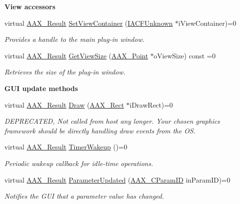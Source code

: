 \begin{Indent}\textbf{ View accessors}\par
\begin{DoxyCompactItemize}
\item 
virtual \mbox{\hyperlink{a00392_a4d8f69a697df7f70c3a8e9b8ee130d2f}{A\+A\+X\+\_\+\+Result}} \mbox{\hyperlink{a01665_a50830385c58f104c87b6ef25144b30dd}{Set\+View\+Container}} (\mbox{\hyperlink{a01409}{I\+A\+C\+F\+Unknown}} $\ast$i\+View\+Container)=0
\begin{DoxyCompactList}\small\item\em Provides a handle to the main plug-\/in window. \end{DoxyCompactList}\item 
virtual \mbox{\hyperlink{a00392_a4d8f69a697df7f70c3a8e9b8ee130d2f}{A\+A\+X\+\_\+\+Result}} \mbox{\hyperlink{a01665_ae67c876225e9b5c538560d19a842a34c}{Get\+View\+Size}} (\mbox{\hyperlink{a01609}{A\+A\+X\+\_\+\+Point}} $\ast$o\+View\+Size) const =0
\begin{DoxyCompactList}\small\item\em Retrieves the size of the plug-\/in window. \end{DoxyCompactList}\end{DoxyCompactItemize}
\end{Indent}
\begin{Indent}\textbf{ G\+UI update methods}\par
\begin{DoxyCompactItemize}
\item 
virtual \mbox{\hyperlink{a00392_a4d8f69a697df7f70c3a8e9b8ee130d2f}{A\+A\+X\+\_\+\+Result}} \mbox{\hyperlink{a01665_a4b132a0bc22ba443027998a56e4eadfb}{Draw}} (\mbox{\hyperlink{a01613}{A\+A\+X\+\_\+\+Rect}} $\ast$i\+Draw\+Rect)=0
\begin{DoxyCompactList}\small\item\em D\+E\+P\+R\+E\+C\+A\+T\+ED, Not called from host any longer. Your chosen graphics framework should be directly handling draw events from the OS. \end{DoxyCompactList}\item 
virtual \mbox{\hyperlink{a00392_a4d8f69a697df7f70c3a8e9b8ee130d2f}{A\+A\+X\+\_\+\+Result}} \mbox{\hyperlink{a01665_aafa484110d39046de1f927f30c9da387}{Timer\+Wakeup}} ()=0
\begin{DoxyCompactList}\small\item\em Periodic wakeup callback for idle-\/time operations. \end{DoxyCompactList}\item 
virtual \mbox{\hyperlink{a00392_a4d8f69a697df7f70c3a8e9b8ee130d2f}{A\+A\+X\+\_\+\+Result}} \mbox{\hyperlink{a01665_a45b468fef806611581f748af9301ab4d}{Parameter\+Updated}} (\mbox{\hyperlink{a00392_a1440c756fe5cb158b78193b2fc1780d1}{A\+A\+X\+\_\+\+C\+Param\+ID}} in\+Param\+ID)=0
\begin{DoxyCompactList}\small\item\em Notifies the G\+UI that a parameter value has changed. \end{DoxyCompactList}\end{DoxyCompactItemize}
\end{Indent}
